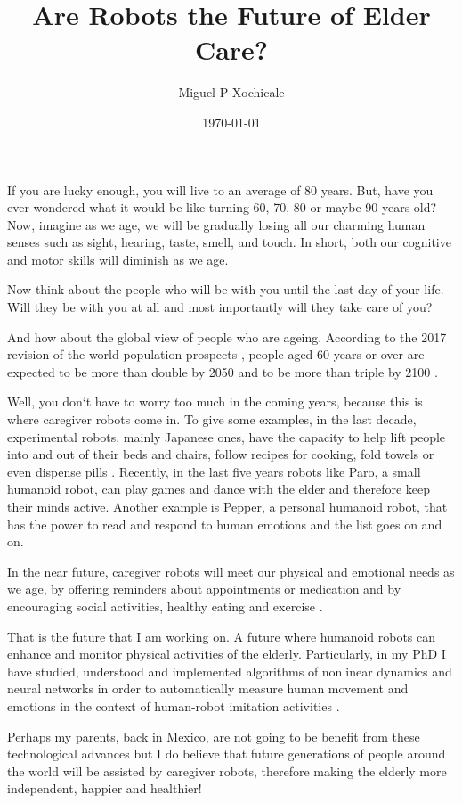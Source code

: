 \documentclass[12pt]{article}
\author{Miguel P Xochicale}
\title{ Are Robots the Future of Elder Care?  }
\date{\today}
\begin{document}
\maketitle

If you are lucky enough, you will live to an average of 80 years.
But, have you ever wondered what it would be like turning 60, 70, 80 or maybe 90 years old?
Now, imagine as we age, we will be gradually losing all our
charming human senses such as sight, hearing, taste, smell, and touch.
In short, both our cognitive and motor skills will diminish as we age.

Now think about the people who will be with you until the last day of your life.
Will they be with you at all 
and most importantly will they take care of you?

And how about the global view of people who are ageing.
According to the 2017 revision of the world population prospects \cite{un2017}, 
people aged 60 years or over
are expected to be more than double by 2050 and to be more than triple by 2100 \cite{unb2017}.

Well, you don`t have to worry too much in the coming years, 
because this is where caregiver robots come in.
To give some examples, in the last decade, experimental robots, mainly Japanese ones, 
have the capacity to help lift people into and out of their beds and chairs,
follow recipes for cooking, fold towels or even dispense pills \cite{matuszek2017}.
Recently, in the last five years robots like
Paro, a small humanoid robot, can play games and dance with the elder
and therefore keep their minds active.
Another example is Pepper, a personal humanoid robot, that has the power 
to read and respond to human emotions \cite{hay2015}
and the list goes on and on.

In the near future, caregiver robots will meet our physical and emotional needs as we age,
by offering reminders about appointments or medication 
and by encouraging social activities, healthy eating and exercise \cite{aronson2014}.

That is the future that I am working on.
A future where humanoid robots can enhance and monitor physical activities of the elderly.
Particularly, in my PhD 
I have studied, understood and implemented algorithms of nonlinear dynamics and neural networks
in order to automatically measure human movement and emotions 
in the context of human-robot imitation activities \cite{xochicale2018}.

Perhaps my parents, back in Mexico, are not going to be benefit 
from these technological advances 
but I do believe that future generations of people around the world 
will be assisted by caregiver robots,
therefore making the elderly more independent, happier and healthier!
\end{document}
